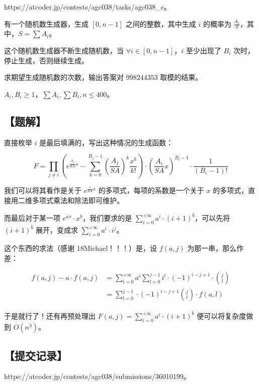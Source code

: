 \documentclass[UTF8,12pt,a4paper]{ctexart}
\begin{document}
	https://atcoder.jp/contests/agc038/tasks/agc038\_e。
	
	有一个随机数生成器，生成 $[0,n-1]$ 之间的整数，其中生成 $i$ 的概率为 $\frac{A_i}{S}$，其中，$S=\sum A_i$。
	
	这个随机数生成器不断生成随机数，当 $\forall i\in[0,n-1]$，$i$ 至少出现了 $B_i$ 次时，停止生成，否则继续生成。
	
	求期望生成随机数的次数，输出答案对 $998244353$ 取模的结果。
	
	$A_i,B_i\geq 1$，$\sum A_i,\sum B_i,n\leq 400$。
	
	\subsection*{【题解】}
	
	直接枚举 $i$ 是最后填满的，写出这种情况的生成函数：
	
	$$
	F=\prod_{j\neq i} \left(e^{\frac{A_j}{SA}x}-\sum_{k=0}^{B_j-1}\left(\frac{A_j}{SA}\right)^k\frac {x^k}{k!}\right)\cdot \left(\frac{A_i}{SA}x\right)^{B_i-1}\cdot \frac{1}{(B_i-1)!}
	$$
	
	我们可以将其看作是关于 $e^{\frac 1{SA}x}$ 的多项式，每项的系数是一个关于 $x$ 的多项式，直接用二维多项式乘法和除法即可维护。
	
	而最后对于某一项 $e^{ax}\cdot x^b$，我们要求的是 $\sum_{i=0}^{+\infty} a^i\cdot(i+1)^{\bar{b}}$，可以先将 $(i+1)^{\bar{b}}$ 展开，变成求 $\sum_{i=0}^{+\infty}a^i\cdot i^j$。
	
	这个东西的求法（感谢 18Michael！！！）是，设 $f(a,j)$ 为那一串，那么作差：
	
	$$
	\begin{aligned}
		f(a,j)-a\cdot f(a,j)
		&=\sum_{i=0}^{+\infty} a^i\sum_{l=0}^{j-1} i^{l}\cdot (-1)^{i-j+1}\cdot\binom{j}{l}\\
		&=\sum_{l=0}^{j-1} \cdot (-1)^{i-j+1}\binom{j}{l} \cdot f(a,l)
	\end{aligned}
	$$
	
	于是就行了！还有再预处理出 $F(a,j)=\sum_{i=0}^{+\infty} a^i\cdot(i+1)^{\bar{b}}$ 便可以将复杂度做到 $O(n^3)$。
	
	\subsection*{【提交记录】}
	
	https://atcoder.jp/contests/agc038/submissions/36010199。
	
\end{document}
